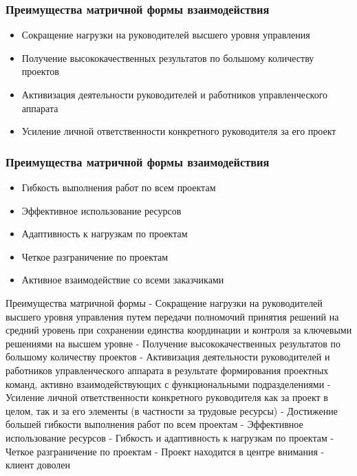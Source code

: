 \documentclass{../industrial-development}
\begin{document}
\begin{frame} \frametitle{Преимущества матричной формы взаимодействия}
  
  \begin{itemize}
  \item Сокращение нагрузки на руководителей высшего уровня управления 
  \item Получение высококачественных результатов по большому количеству проектов
  \item Активизация деятельности руководителей и работников управленческого аппарата
  \item Усиление личной ответственности конкретного руководителя за его проект
  \end{itemize}
\end{frame}

\begin{frame} \frametitle{Преимущества матричной формы взаимодействия}
  
  \begin{itemize}
 \item Гибкость выполнения работ по всем проектам
 \item Эффективное использование ресурсов
 \item Адаптивность к нагрузкам по проектам
 \item Четкое разграничение по проектам
 \item Активное взаимодействие со всеми заказчиками
  \end{itemize}
\end{frame}

\lecturenotes
Преимущества матричной формы
- Сокращение нагрузки на руководителей высшего уровня управления путем передачи полномочий принятия решений на средний уровень при сохранении единства координации и контроля за ключевыми решениями на высшем уровне
- Получение высококачественных результатов по большому количеству проектов
- Активизация деятельности руководителей и работников управленческого аппарата в результате формирования проектных команд, активно взаимодействующих с функциональными подразделениями
- Усиление личной ответственности конкретного руководителя как за проект в целом, так и за его элементы (в частности за трудовые ресурсы)
- Достижение большей гибкости выполнения работ по всем проектам
- Эффективное использование ресурсов
- Гибкость и адаптивность к нагрузкам по проектам
- Четкое разграничение по проектам
- Проект находится в центре внимания - клиент доволен
\end{document}
